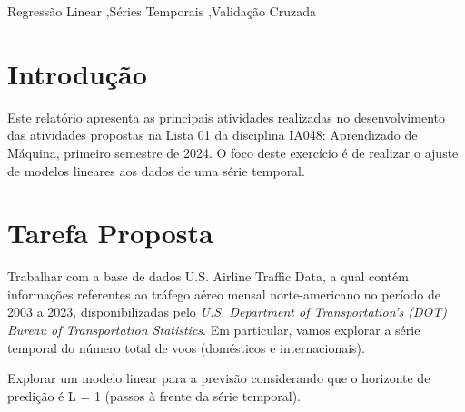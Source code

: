 \documentclass[final,5p]{elsarticle}
\numberwithin{equation}{section}
\begin{document}
\begin{frontmatter}

\begin{keyword}
    Regressão Linear \sep Séries Temporais \sep Validação Cruzada



\end{keyword}

\end{frontmatter}

\section{Introdução}

    Este relatório apresenta as principais atividades realizadas no desenvolvimento das atividades propostas na Lista 01 da disciplina IA048: Aprendizado de Máquina, primeiro semestre de 2024. O foco deste exercício é de realizar o ajuste de modelos lineares aos dados de uma série temporal.

\section{Tarefa Proposta}

    Trabalhar com a base de dados U.S. Airline Traffic Data, a qual contém informações referentes ao tráfego aéreo mensal norte-americano no período de 2003 a 2023, disponibilizadas pelo \emph{U.S. Department of Transportation’s (DOT) Bureau of Transportation Statistics}. Em particular, vamos explorar a série temporal do número total de voos (domésticos e internacionais).

    Explorar um modelo linear para a previsão considerando que o horizonte de predição é L = 1 (passos à frente da série temporal).
\end{document}
